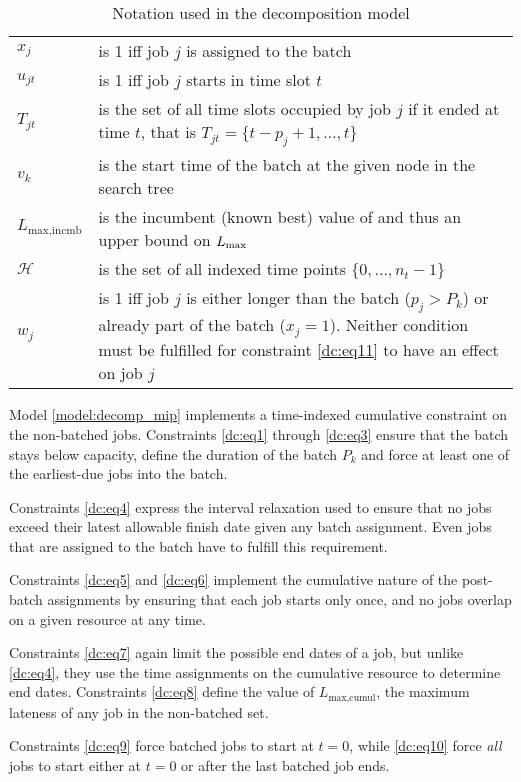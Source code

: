 \begin{table}[h]
\begin{tabular}{l p{5in}}
$x_j$ & is 1 iff job $j$ is assigned to the batch \\
$u_{jt}$ & is 1 iff job $j$ starts in time slot $t$ \\
$T_{jt}$ & is the set of all time slots occupied by job $j$ if it ended at time
$t$, that is $T_{jt} = \{t - p_j + 1, \dots, t\}$ \\
$v_k$ & is the start time of the batch at the given node in the search tree \\
$L_{\text{max,incmb}}$ & is the incumbent (known best) value of and thus an
upper bound on $L_{\text{max}}$ \\
$\mathcal{H}$ & is the set of all indexed time points $\{0, \dots, n_t - 1\}$ \\
$w_j$ & is 1 iff job $j$ is either longer than the batch ($p_j > P_k$) or
already part of the batch ($x_j = 1$). Neither condition must be fulfilled for constraint
\eqref{dc:eq11} to have an effect on job $j$
\end{tabular}
\caption{Notation used in the decomposition model}
\end{table}

Model \ref{model:decomp_mip} implements a time-indexed cumulative constraint on the
non-batched jobs. Constraints \eqref{dc:eq1} through \eqref{dc:eq3} ensure that the
batch stays below capacity, define the duration of the batch $P_k$ and force at
least one of the earliest-due jobs into the batch.

Constraints \eqref{dc:eq4} express the interval relaxation used to ensure that no
jobs exceed their latest allowable finish date given any batch assignment. Even
jobs that are assigned to the batch have to fulfill this requirement.

Constraints \eqref{dc:eq5} and \eqref{dc:eq6} implement the cumulative nature of the
post-batch assignments by ensuring that each job starts only once, and no jobs
overlap on a given resource at any time.

Constraints \eqref{dc:eq7} again limit the possible end dates of a
job, but unlike \eqref{dc:eq4}, they use the time assignments on the cumulative
resource to determine end dates. Constraints \eqref{dc:eq8} define the value of
$L_{\text{max,cumul}}$, the maximum lateness of any job in the non-batched set.

Constraints \eqref{dc:eq9} force batched jobs to start at $t = 0$, while
\eqref{dc:eq10} force \textit{all} jobs to start either at $t = 0$ or after the
last batched job ends.


